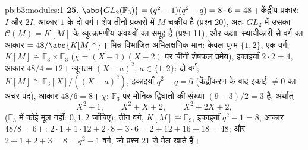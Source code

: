 \begin{solution}{pb:b3:modules:1}
\textbf{25.} $\abs{GL_2(\mathbb F_3)} = (q^2 - 1)(q^2 - q) =
8 \cdot 6 = 48$। केंद्रीय प्रकार: $I$ और $2I$, आकार $1$ के
दो वर्ग। शेष तीनों प्रकारों में $M$ चक्रीय है (प्रश्न 20), अतः
$GL_2$ में उसका  $\mathcal C(M) = K[M]$ के व्युत्क्रमणीय अवयवों का समूह है
(प्रश्न 11), और कक्षा--स्थायीकारी से वर्ग का आकार $=48/\abs{K[M]^\times}$। भिन्न
विभाजित अभिलक्षणिक मान: केवल युग्म $\{1, 2\}$, एक वर्ग; $K[M]
\cong \mathbb F_3 \times \mathbb F_3$ ($\chi = (X-1)
(X-2)$ पर
चीनी शेषफल प्रमेय), इकाइयाँ $2 \cdot 2 = 4$, आकार $48/4 = 12$। न्यूनतम $(X - a)^2$, $a \in \{1, 2\}$:
दो वर्ग; $K[M] \cong
\mathbb F_3[X]/((X-a)^2)$, इकाइयाँ $q^2 - q = 6$ (केंद्रीकरण के बाद इकाई $\neq 0$ का अचर
पद), आकार $48/6 = 8$।  $\chi$: $\mathbb F_3$ पर मोनिक  द्विघातों
की संख्या $(9 - 3)/2 = 3$ है, अर्थात्
\[
X^2 + 1, \qquad X^2 + X + 2, \qquad X^2 + 2X + 2,
\]
($\mathbb F_3$ में कोई मूल नहीं: $0, 1, 2$ जाँचिए); तीन वर्ग, $K[M] \cong \mathbb F_9$, इकाइयाँ
$q^2 - 1 = 8$, आकार $48/8 =
6$। : $2\cdot1 + 1\cdot12 + 2\cdot8 + 3\cdot6 =
2 + 12 + 16 + 18 = 48$; और $2 + 1 + 2 + 3 = 8 = q^2 - 1$ वर्ग, जो प्रश्न 21
से मेल खाते हैं।
\end{solution}
